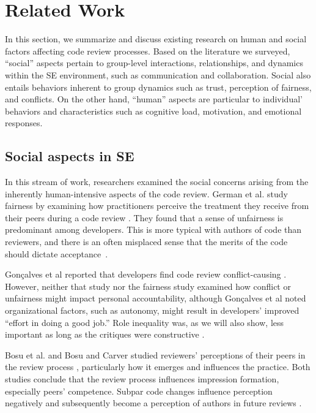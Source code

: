 \section{Related Work}
\label{sec:related}

In this section, we summarize and discuss existing research on human and social factors affecting code review processes. Based on the literature we surveyed, ``social'' aspects pertain to group-level interactions, relationships, and dynamics within the SE environment, such as communication and collaboration. Social also entails behaviors inherent to group dynamics such as trust, perception of fairness, and conflicts. On the other hand, ``human'' aspects are particular to individual' behaviors and characteristics such as cognitive load, motivation, and emotional responses.

\subsection{Social aspects in SE}

In this stream of work, researchers examined the social concerns arising from the inherently human-intensive aspects of the code review. German et al. study fairness by examining how practitioners perceive the treatment they receive from their peers during a code review \citep{german2018my}. They found that a sense of unfairness is predominant among developers. This is more typical with authors of code than reviewers, and there is an often misplaced sense that the merits of the code should dictate acceptance~\citep{german2018my}.

Gon\c{c}alves et al reported that developers find code review conflict-causing \citep{goncalves22}. However, neither that study nor the fairness study \citep{german2018my} examined how conflict or unfairness might impact personal accountability, although Gon\c{c}alves et al noted organizational factors, such as autonomy, might result in developers' improved ``effort in doing a good job.'' Role inequality was, as we will also show, less important as long as the critiques were constructive \citep{goncalves22}. 

Bosu et al. and Bosu and Carver studied reviewers' perceptions of their peers in the review process \citep{bosu2013impact,bosu2016process}, particularly how it emerges and influences the practice. Both studies conclude that the review process influences impression formation, especially peers' competence. Subpar code changes influence perception negatively and subsequently become a perception of authors in future reviews \citep{bosu2013impact,bosu2016process}.

